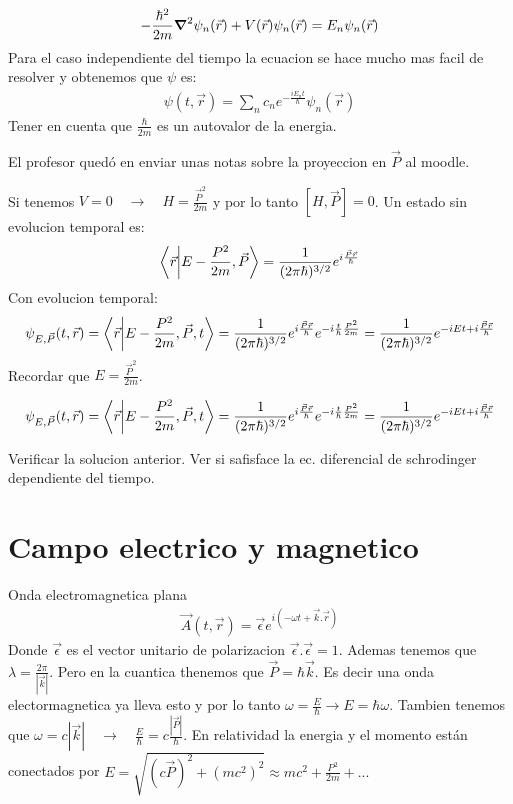 \documentclass{article}
\newcommand{\caja}[3]{%
  \begin{tcolorbox}[colback=#1!5!white,colframe=#1!25!black,title=#2]
    #3
  \end{tcolorbox}%
}
\begin{document}
\caja{red}{Ecuacion de Schrodinger \textbf{independiente} del tiempo }{
  \begin{gather*}
    - \frac{\hbar  ^2}{2m }\grad ^2 \psi_n (\vec r ) + V(\vec r) \psi_n(\vec r ) = E_n \psi_n (\vec r )
  \end{gather*}
  Para el caso independiente del tiempo la ecuacion se hace mucho mas facil de resolver y obtenemos que $ \psi  $ es: 
  \begin{gather*}
    \psi(t, \vec r ) = \displaystyle\sum_{n }^{} c_n e ^ {- \frac{i E_n t }{\hbar }}\psi_n(\vec r)  
  \end{gather*}
  Tener en cuenta que $ \frac{\hbar }{2m } $ es un autovalor de la energia.
}
\caja{black}{}{
  El profesor quedó en enviar unas notas sobre la proyeccion en $ \vec P  $ al moodle.
}
Si tenemos $ V = 0 \quad \rightarrow \quad H = \frac{\vec P ^2}{2m } $ y por lo tanto $ [H,\vec P ] = 0  $.
Un estado sin evolucion temporal es: 
\begin{gather*}
  \bra{\vec r }\ket{E- \frac{P ^2}{2m }, \vec P }  = \frac{1}{(2 \pi \hbar ) ^ {3/2 }} e ^ {i \frac{\vec P \vec r }{\hbar }}
\end{gather*}
Con evolucion temporal: 
\begin{gather*}
  \psi _{E, \vec P } (t, \vec r) = \bra{\vec r }\ket{E- \frac{P ^2}{2m }, \vec P, t }  = \frac{1}{(2 \pi \hbar ) ^ {3/2 }} e ^ {i \frac{\vec P \vec r }{\hbar }} e ^ {-i \frac{t }{\hbar } \frac{P ^2}{2m }}
  = \frac{1}{(2 \pi \hbar )^ {3/2 }}e ^ {-i Et + i \frac{\vec P \vec r }{\hbar }}
\end{gather*}
Recordar que $ E = \frac{\vec P ^2}{2m } $.
\caja{red}{Solucion eq. schrodinger dependiente del tiempo }{
  \begin{gather*}
    \psi _{E, \vec P } (t, \vec r) = \bra{\vec r }\ket{E- \frac{P ^2}{2m }, \vec P, t }  = \frac{1}{(2 \pi \hbar ) ^ {3/2 }} e ^ {i \frac{\vec P \vec r }{\hbar }} e ^ {-i \frac{t }{\hbar } \frac{P ^2}{2m }}
    = \frac{1}{(2 \pi \hbar )^ {3/2 }}e ^ {-i Et + i \frac{\vec P \vec r }{\hbar }}
  \end{gather*}
}
\caja{blue}{Ejercicio }{
  Verificar la solucion anterior. Ver si safisface la ec. diferencial de schrodinger dependiente del tiempo.
}

\section{Campo electrico y magnetico }
Onda electromagnetica plana
\begin{gather*}
  \vec A(t,\vec r ) = \vec \epsilon e ^ {i (-\omega t + \vec k . \vec r)} 
\end{gather*}
Donde $ \vec \epsilon $ es el vector unitario de polarizacion $ \vec \epsilon . \vec \epsilon = 1  $. Ademas tenemos que $ \lambda = \frac{2 \pi}{\left|\vec k \right|} $. Pero en la cuantica thenemos que $ \vec P = \hbar \vec k  $. Es decir una onda electormagnetica ya lleva esto y por lo tanto $ \omega = \frac{E }{\hbar } \rightarrow E = \hbar \omega $. Tambien tenemos que $ \omega = c \left|\vec k \right| \quad \rightarrow\quad \frac{E}{\hbar } = c \frac{\left|\vec P \right|}{\hbar }$. En relatividad la energia y el momento están conectados por $ E = \sqrt{(c\vec P )^2 + (mc ^2)^2} \approx m c ^2 + \frac{P ^2}{2m } + ...  $
\end{document}
